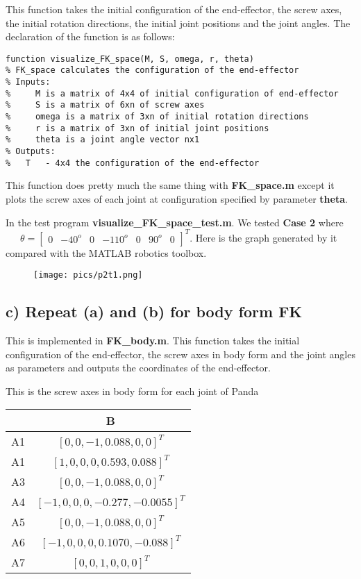 \documentclass[english,10pt,a4paper]{book}
\begin{document}
    This function takes the initial configuration of the end-effector, the screw axes, the initial rotation directions, the initial joint positions and the joint angles. The declaration of the function is as follows:
    \begin{lstlisting}[style=matlab]
function visualize_FK_space(M, S, omega, r, theta)
% FK_space calculates the configuration of the end-effector
% Inputs:
%     M is a matrix of 4x4 of initial configuration of end-effector
%     S is a matrix of 6xn of screw axes
%     omega is a matrix of 3xn of initial rotation directions
%     r is a matrix of 3xn of initial joint positions
%     theta is a joint angle vector nx1
% Outputs:
%   T   - 4x4 the configuration of the end-effector
    \end{lstlisting}
    This function does pretty much the same thing with \textbf{FK\_space.m} except it plots the screw axes of each joint at configuration specified by parameter \textbf{theta}.
	
    In the test program \textbf{visualize\_FK\_space\_test.m}. We tested \textbf{Case 2} where \ \ \ $\theta = \begin{bmatrix}
        0 & -40^o & 0 & -110^o & 0 & 90^o & 0
    \end{bmatrix}^T$. Here is the graph generated by it compared with the MATLAB robotics toolbox.
    \begin{figure}[H]
        \texttt{[image: pics/p2t1.png]}
    \end{figure}
    \subsection*{c) Repeat (a) and (b) for body form FK}
    This is implemented in \textbf{FK\_body.m}. This function takes the initial configuration of the end-effector, the screw axes in body form and the joint angles as parameters and outputs the coordinates of the end-effector.
    
    This is the screw axes in body form for each joint of Panda
    \begin{center}
        \begin{tabular}{|c|c|}
            \hline
            &  B \\
            \hline
            A1 & $[0, 0, -1, 0.088, 0, 0]^{T}$ \\
            \hline
            A1 & $[1, 0, 0, 0, 0.593, 0.088]^{T}$ \\
            \hline
            A3 & $[0, 0, -1, 0.088, 0, 0]^{T}$ \\
            \hline
            A4 & $[-1, 0, 0, 0, -0.277, -0.0055]^{T}$ \\
            \hline
            A5 & $[0, 0, -1, 0.088, 0, 0]^{T}$  \\
            \hline
            A6 & $[-1, 0, 0, 0, 0.1070, -0.088]^{T}$  \\
            \hline
            A7 & $[0, 0, 1, 0, 0, 0]^{T}$ \\
            \hline
        \end{tabular}
    \end{center}
	
\end{document}
